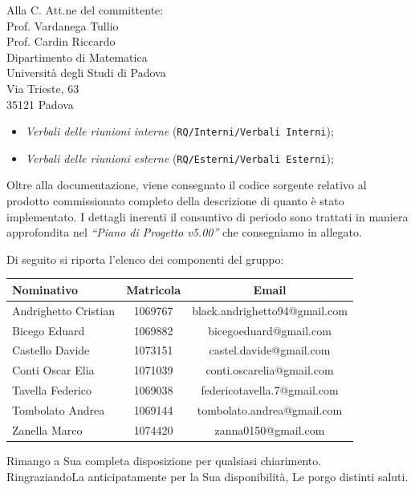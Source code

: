 \documentclass[a4paper,12pt]{letteracdp}
\begin{document}
\begin{letter}{
		Alla C. Att.ne del committente: \\
		Prof. Vardanega Tullio \\
		Prof. Cardin Riccardo \\
		Dipartimento di Matematica \\
		Università degli Studi di Padova \\
		Via Trieste, 63 \\
		35121 Padova}
\begin{itemize}
	\item \textit{Verbali delle riunioni interne}	(\texttt{RQ/Interni/Verbali Interni});
	
	\item \textit{Verbali delle riunioni esterne}	(\texttt{RQ/Esterni/Verbali Esterni});
		
\end{itemize}

Oltre alla documentazione, viene consegnato il codice sorgente relativo al prodotto commissionato completo della descrizione di quanto è stato implementato. I dettagli inerenti il consuntivo di periodo sono trattati in maniera approfondita nel \textit{``Piano di Progetto v5.00''} che consegniamo in allegato.

\newpage
Di seguito si riporta l'elenco dei componenti del gruppo:

\begin{center}
		\begin{tabular}{l c c}
			\toprule
			\textbf{Nominativo} & \textbf{Matricola} & \textbf{Email} \\
			\midrule
			Andrighetto Cristian & 1069767 & black.andrighetto94@gmail.com \\
			Bicego Eduard & 1069882 & bicegoeduard@gmail.com  \\
			Castello Davide	& 1073151 &	 castel.davide@gmail.com\\
			Conti Oscar Elia & 1071039 & conti.oscarelia@gmail.com \\
			Tavella Federico & 1069038 & federicotavella.7@gmail.com\\
			Tombolato Andrea & 1069144 & tombolato.andrea@gmail.com	 \\
			Zanella Marco & 1074420 & zanna0150@gmail.com \\
			\bottomrule
		\end{tabular}
\end{center}
		
		\closing{Rimango a Sua completa disposizione per qualsiasi chiarimento. \\
		RingraziandoLa anticipatamente per la Sua disponibilità, Le porgo distinti saluti.}
		
	\end{letter}
\end{document}
